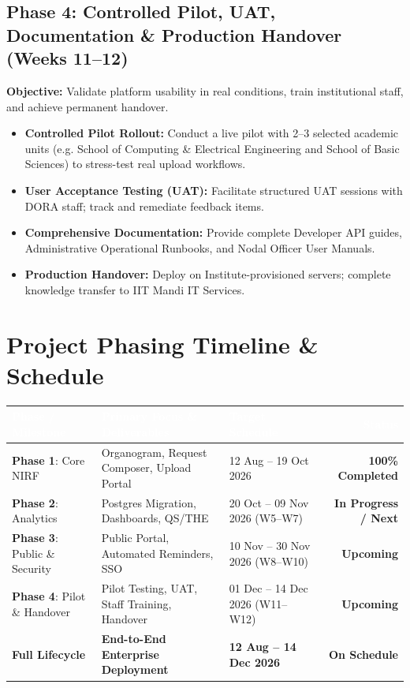 \documentclass[11pt,a4paper]{article}
\begin{document}
\subsection{Phase 4: Controlled Pilot, UAT, Documentation \& Production Handover (Weeks 11--12)}
\textbf{Objective:} Validate platform usability in real conditions, train institutional staff, and achieve permanent handover.
\begin{itemize}[leftmargin=1.4em, itemsep=2.5pt]
\item \textbf{Controlled Pilot Rollout:} Conduct a live pilot with 2--3 selected academic units (e.g. School of Computing \& Electrical Engineering and School of Basic Sciences) to stress-test real upload workflows.
\item \textbf{User Acceptance Testing (UAT):} Facilitate structured UAT sessions with DORA staff; track and remediate feedback items.
\item \textbf{Comprehensive Documentation:} Provide complete Developer API guides, Administrative Operational Runbooks, and Nodal Officer User Manuals.
\item \textbf{Production Handover:} Deploy on Institute-provisioned servers; complete knowledge transfer to IIT Mandi IT Services.
\end{itemize}

\section{Project Phasing Timeline \& Schedule}

\begin{table}[h]
\centering
\small
\renewcommand{\arraystretch}{1.2}
\begin{tabular}{p{2.8cm} p{4.6cm} p{4.2cm} r}
\toprule
\rowcolor{primary}
\textcolor{white}{\textbf{Phase / Milestone}} & \textcolor{white}{\textbf{Primary Focus \& Deliverables}} & \textcolor{white}{\textbf{Target Schedule}} & \textcolor{white}{\textbf{Status}} \\
\midrule
\textbf{Phase 1}: Core NIRF & Organogram, Request Composer, Upload Portal & 12 Aug -- 19 Oct 2026 & \textcolor{accentgreen}{\textbf{100\% Completed}} \\
\rowcolor{lightbg}
\textbf{Phase 2}: Analytics & Postgres Migration, Dashboards, QS/THE & 20 Oct -- 09 Nov 2026 (W5--W7) & \textcolor{accentamber}{\textbf{In Progress / Next}} \\
\textbf{Phase 3}: Public \& Security & Public Portal, Automated Reminders, SSO & 10 Nov -- 30 Nov 2026 (W8--W10) & \textbf{Upcoming} \\
\rowcolor{lightbg}
\textbf{Phase 4}: Pilot \& Handover & Pilot Testing, UAT, Staff Training, Handover & 01 Dec -- 14 Dec 2026 (W11--W12) & \textbf{Upcoming} \\
\midrule
\rowcolor{secondary!15}
\textbf{Full Lifecycle} & \textbf{End-to-End Enterprise Deployment} & \textbf{12 Aug -- 14 Dec 2026} & \textbf{On Schedule} \\
\bottomrule
\end{tabular}
\end{table}
\end{document}
